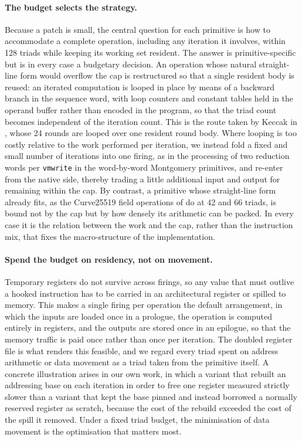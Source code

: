 \paragraph{The budget selects the strategy.}
Because a patch is small, the central question for each primitive is how to
accommodate a complete operation, including any iteration it involves, within
128 triads while keeping its working set resident. The answer is
primitive-specific but is in every case a budgetary decision. An operation whose
natural straight-line form would overflow the cap is restructured so that a
single resident body is reused: an iterated computation is looped in place by
means of a backward branch in the sequence word, with loop counters and constant
tables held in the operand buffer rather than encoded in the program, so that
the triad count becomes independent of the iteration count. This is the route
taken by Keccak in , whose 24 rounds are looped over one
resident round body. Where looping is too costly relative to the work performed
per iteration, we instead fold a fixed and small number of iterations into one
firing, as in the processing of two reduction words per \texttt{vmwrite} in the
word-by-word Montgomery primitives, and re-enter from the native side, thereby
trading a little additional input and output for remaining within the cap. By
contrast, a primitive whose straight-line form already fits, as the Curve25519
field operations of  do at 42 and 66 triads, is bound not
by the cap but by how densely its arithmetic can be packed. In every case it is
the relation between the work and the cap, rather than the instruction mix, that
fixes the macro-structure of the implementation.

\paragraph{Spend the budget on residency, not on movement.}
Temporary registers do not survive across firings, so any value that must
outlive a hooked instruction has to be carried in an architectural register or
spilled to memory. This makes a single firing per operation the default
arrangement, in which the inputs are loaded once in a prologue, the operation is
computed entirely in registers, and the outputs are stored once in an epilogue,
so that the memory traffic is paid once rather than once per iteration. The
doubled register file is what renders this feasible, and we regard every triad
spent on address arithmetic or data movement as a triad taken from the primitive
itself. A concrete illustration arises in our own work, in which a variant that
rebuilt an addressing base on each iteration in order to free one register
measured strictly slower than a variant that kept the base pinned and instead
borrowed a normally reserved register as scratch, because the cost of the rebuild
exceeded the cost of the spill it removed. Under a fixed triad budget, the
minimisation of data movement is the optimisation that matters most.


